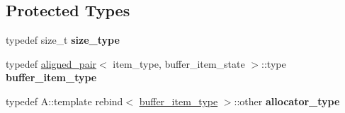 \subsection*{Protected Types}
\begin{DoxyCompactItemize}
\item 
\hypertarget{classinternal_1_1item__buffer_a6a2675b3a5ccf1cb45960a06bd39ca9a}{}typedef size\+\_\+t {\bfseries size\+\_\+type}\label{classinternal_1_1item__buffer_a6a2675b3a5ccf1cb45960a06bd39ca9a}

\item 
\hypertarget{classinternal_1_1item__buffer_add5d0f73b0fea9e227572e514a984111}{}typedef \hyperlink{structinternal_1_1aligned__pair}{aligned\+\_\+pair}$<$ item\+\_\+type, buffer\+\_\+item\+\_\+state $>$\+::type {\bfseries buffer\+\_\+item\+\_\+type}\label{classinternal_1_1item__buffer_add5d0f73b0fea9e227572e514a984111}

\item 
\hypertarget{classinternal_1_1item__buffer_a6cb45179ba3ccb0f45836fdab4136a23}{}typedef A\+::template rebind$<$ \hyperlink{structinternal_1_1type__plus__align}{buffer\+\_\+item\+\_\+type} $>$\+::other {\bfseries allocator\+\_\+type}\label{classinternal_1_1item__buffer_a6cb45179ba3ccb0f45836fdab4136a23}

\end{DoxyCompactItemize}
